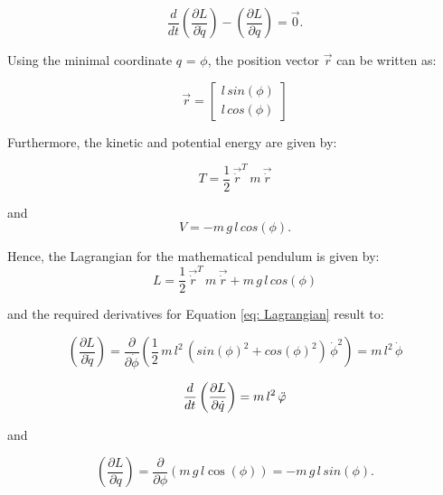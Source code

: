 \documentclass[12pt,bibstyle=none,pagenumberinfooter]{ifmdocument}
\begin{document}
\begin{equation}
\label{eq: secondKindLagrangian}
    \frac{d}{dt}\left(\frac{\partial L}{\partial \Dot{q}}\right) - \left(\frac{\partial L}{\partial q}  \right) = \Vec{0}.
\end{equation}

Using the minimal coordinate $q$ = $\phi$, the position vector $\Vec{r}$ can be written as:

\begin{equation}
    \Vec{r} = \begin{bmatrix}
        l\,sin(\phi) \\ l\, cos(\phi) 
        \end{bmatrix}
\end{equation}

Furthermore, the kinetic and potential energy are given by:

\begin{equation}
    T = \frac{1}{2}\,\Vec{\Dot{r}}^T\,m\,\Vec{\Dot{r}}
\end{equation}

and 
\begin{equation}
    V = -m\,g\,l\,cos(\phi).
\end{equation}

Hence, the Lagrangian for the mathematical pendulum is given by:
\begin{equation}
    L = \frac{1}{2}\,\Vec{\Dot{r}}^T\,m\,\Vec{\Dot{r}} + m\,g\,l\,cos(\phi)
\end{equation}

and the required derivatives for Equation \ref{eq: Lagrangian} result to:

\begin{equation}
    \left(\frac{\partial L}{\partial \Dot{q}}\right) = \frac{\partial}{\partial \Dot{\phi}} \left( \frac{1}{2}\,m\,l^2\,(sin(\phi)^2 + cos(\phi)^2)\,\Dot{\phi}^2 \right) = m\,l^2\,\Dot{\phi}
\end{equation}

\begin{equation}
\label{eq: LagFirstPart}
    \frac{d}{dt}\left(\frac{\partial L}{\partial \Dot{q}}\right) = m\,l^2\,\Ddot{\phi}
\end{equation}

and 

\begin{equation}
\label{eq: LagSecondPart}
    \left(\frac{\partial L}{\partial q}  \right) = \frac{\partial}{\partial \phi} \left(m\,g\,l\cos(\phi)\right) = -m\,g\,l\,sin(\phi).
\end{equation}
\end{document}
